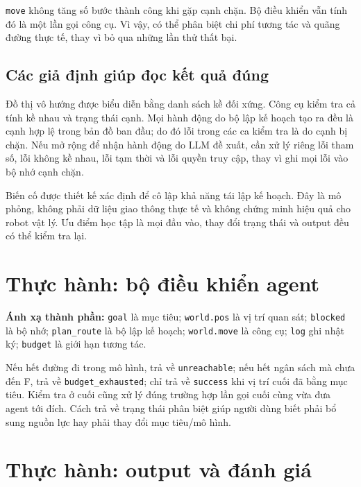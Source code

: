 \documentclass[12pt,a4paper]{article}
\begin{document}
\texttt{move} không tăng số bước thành công khi gặp cạnh chặn. Bộ điều khiển vẫn tính
đó là một lần gọi công cụ. Vì vậy, có thể phân biệt chi phí tương tác và quãng đường
thực tế, thay vì bỏ qua những lần thử thất bại.

\subsection{Các giả định giúp đọc kết quả đúng}
Đồ thị vô hướng được biểu diễn bằng danh sách kề đối xứng. Công cụ kiểm tra cả tính
kề nhau và trạng thái cạnh. Mọi hành động do bộ lập kế hoạch tạo ra đều là cạnh hợp lệ
trong bản đồ ban đầu; do đó lỗi trong các ca kiểm tra là do cạnh bị chặn. Nếu mở rộng
để nhận hành động do LLM đề xuất, cần xử lý riêng lỗi tham số, lỗi không kề nhau, lỗi
tạm thời và lỗi quyền truy cập, thay vì ghi mọi lỗi vào bộ nhớ cạnh chặn.

Biến cố được thiết kế xác định để cô lập khả năng tái lập kế hoạch. Đây là mô phỏng,
không phải dữ liệu giao thông thực tế và không chứng minh hiệu quả cho robot vật lý.
Ưu điểm học tập là mọi đầu vào, thay đổi trạng thái và output đều có thể kiểm tra lại.

\newpage
\section*{Thực hành: bộ điều khiển agent}

\noindent\textbf{Ánh xạ thành phần:} \texttt{goal} là mục tiêu;
\texttt{world.pos} là vị trí quan sát; \texttt{blocked} là bộ nhớ;
\texttt{plan\_route} là bộ lập kế hoạch; \texttt{world.move} là công cụ;
\texttt{log} ghi nhật ký; \texttt{budget} là giới hạn tương tác.

Nếu hết đường đi trong mô hình, trả về \texttt{unreachable}; nếu hết ngân sách mà chưa
đến F, trả về \texttt{budget\_exhausted}; chỉ trả về \texttt{success} khi vị trí cuối
đã bằng mục tiêu. Kiểm tra ở cuối cũng xử lý đúng trường hợp lần gọi cuối cùng vừa
đưa agent tới đích. Cách trả về trạng thái phân biệt giúp người dùng biết phải bổ sung
nguồn lực hay phải thay đổi mục tiêu/mô hình.

\newpage
\section*{Thực hành: output và đánh giá}
\end{document}
